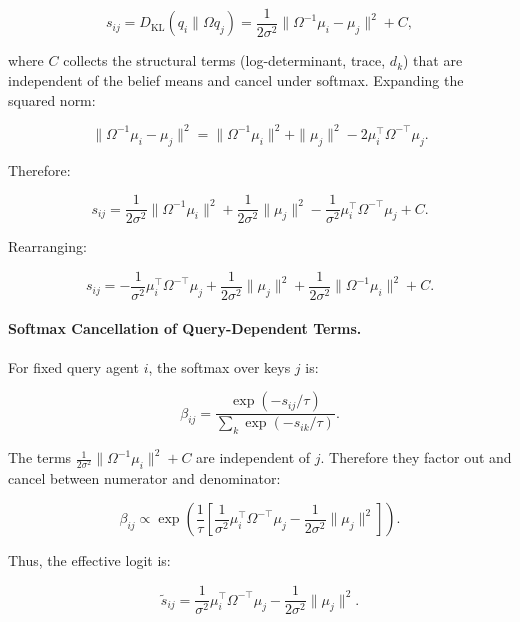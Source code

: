 \documentclass[twoside,11pt]{article}
\begin{document}
\begin{equation}
s_{ij} = D_{\mathrm{KL}}(q_i \| \Omega q_j) = \frac{1}{2\sigma^2}\|\Omega^{-1}\mu_i - \mu_j\|^2 + C,
\end{equation}

where $C$ collects the structural terms (log-determinant, trace, $d_k$) that are independent of the belief means and cancel under softmax. Expanding the squared norm:

\begin{equation}
\|\Omega^{-1}\mu_i - \mu_j\|^2 = \|\Omega^{-1}\mu_i\|^2 + \|\mu_j\|^2 - 2\mu_i^\top \Omega^{-\top} \mu_j.
\end{equation}

Therefore:

\begin{equation}
s_{ij} = \frac{1}{2\sigma^2}\|\Omega^{-1}\mu_i\|^2 + \frac{1}{2\sigma^2}\|\mu_j\|^2 - \frac{1}{\sigma^2}\mu_i^\top \Omega^{-\top}\mu_j + C.
\end{equation}

Rearranging:

\begin{equation}
s_{ij} = -\frac{1}{\sigma^2}\mu_i^\top \Omega^{-\top}\mu_j + \frac{1}{2\sigma^2}\|\mu_j\|^2 + \frac{1}{2\sigma^2}\|\Omega^{-1}\mu_i\|^2 + C.
\end{equation}

\paragraph{Softmax Cancellation of Query-Dependent Terms.}

For fixed query agent $i$, the softmax over keys $j$ is:

\begin{equation}
\beta_{ij} = \frac{\exp(-s_{ij}/\tau)}{\sum_k \exp(-s_{ik}/\tau)}.
\end{equation}

The terms $\frac{1}{2\sigma^2}\|\Omega^{-1}\mu_i\|^2 + C$ are independent of $j$. Therefore they factor out and cancel between numerator and denominator:

\begin{equation}
\beta_{ij} \propto \exp\left(\frac{1}{\tau}\left[\frac{1}{\sigma^2}\mu_i^\top\Omega^{-\top}\mu_j - \frac{1}{2\sigma^2}\|\mu_j\|^2\right]\right).
\end{equation}

Thus, the effective logit is:

\begin{equation}
\tilde{s}_{ij} = \frac{1}{\sigma^2}\mu_i^\top\Omega^{-\top}\mu_j - \frac{1}{2\sigma^2}\|\mu_j\|^2.
\end{equation}
\end{document}
